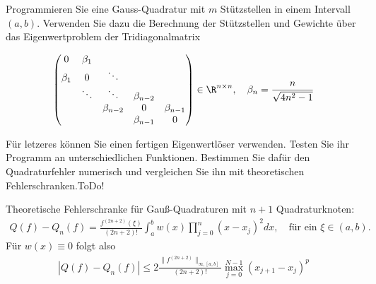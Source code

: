 
\begin{exercise}

Programmieren Sie eine Gauss-Quadratur mit $m$ Stützstellen in einem Intervall $(a,b)$.
Verwenden Sie dazu die Berechnung der Stützstellen und Gewichte über das Eigenwertproblem der
Tridiagonalmatrix

\begin{align}
  \begin{pmatrix}
  0 & \beta_1 & & & \\
  \beta_1 & 0 & \ddots & & \\
  & \ddots & \ddots & \beta_{n-2} & \\
  & & \beta_{n-2} & 0 & \beta_{n-1} \\
  & & & \beta_{n-1} & 0
  \end{pmatrix}
  \in \R^{n \times n}, \quad
  \beta_n = \frac{n}{\sqrt{4n^2 -1}}
\end{align}

Für letzeres können Sie einen fertigen Eigenwertlöser verwenden. Testen Sie ihr Programm an
unterschiedlichen Funktionen. Bestimmen Sie dafür den Quadraturfehler numerisch und vergleichen
Sie ihn mit theoretischen Fehlerschranken.ToDo!
\end{exercise}


\begin{solution}

Theoretische Fehlerschranke für Gauß-Quadraturen mit $n + 1$ Quadraturknoten:
\begin{align*}
  Q(f) - Q_n(f) = \frac{f^{(2n+2)}(\xi)}{(2n+2)!}\int_a^bw(x)\prod_{j=0}^n(x - x_j)^2dx,
  \quad \text{für ein } \xi \in (a,b).
\end{align*}
Für $w(x) \equiv 0$ folgt also
\begin{align*}
  |Q(f) - Q_n(f)| \leq 2\frac{\|f^{(2n+2)}\|_{\infty,[a,b]}}{(2n+2)!}\max_{j=0}^{N-1} (x_{j+1} - x_j)^p
\end{align*}
\end{solution}

